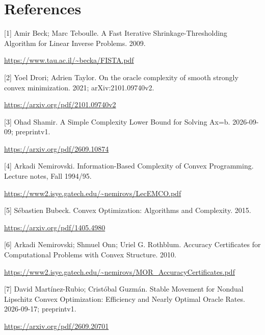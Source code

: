 \documentclass[10pt,a4paper]{article}
\begin{document}
\section{References}
[1] Amir Beck; Marc Teboulle. A Fast Iterative Shrinkage-Thresholding Algorithm for Linear Inverse Problems. 2009.

\url{https://www.tau.ac.il/~becka/FISTA.pdf}

[2] Yoel Drori; Adrien Taylor. On the oracle complexity of smooth strongly convex minimization. 2021; arXiv:2101.09740v2.

\url{https://arxiv.org/pdf/2101.09740v2}

[3] Ohad Shamir. A Simple Complexity Lower Bound for Solving Ax=b. 2026-09-09; preprintv1.

\url{https://arxiv.org/pdf/2609.10874}

[4] Arkadi Nemirovski. Information-Based Complexity of Convex Programming. Lecture notes, Fall 1994/95.

\url{https://www2.isye.gatech.edu/~nemirovs/LecEMCO.pdf}

[5] Sébastien Bubeck. Convex Optimization: Algorithms and Complexity. 2015.

\url{https://arxiv.org/pdf/1405.4980}

[6] Arkadi Nemirovski; Shmuel Onn; Uriel G. Rothblum. Accuracy Certificates for Computational Problems with Convex Structure. 2010.

\url{https://www2.isye.gatech.edu/~nemirovs/MOR_AccuracyCertificates.pdf}

[7] David Martínez-Rubio; Cristóbal Guzmán. Stable Movement for Nondual Lipschitz Convex Optimization: Efficiency and Nearly Optimal Oracle Rates. 2026-09-17; preprintv1.

\url{https://arxiv.org/pdf/2609.20701}
\end{document}
